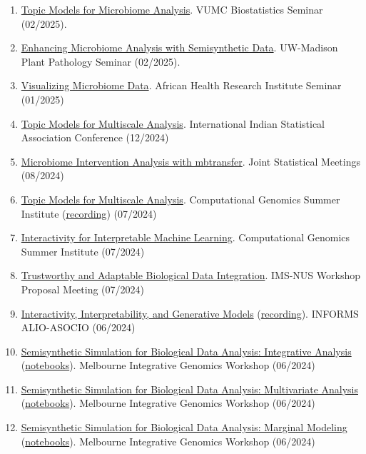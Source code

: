 \documentclass[letterpaper]{article}
\begin{document}
\begin{enumerate}
  \item \href{https://krisrs1128.github.io/talks/2025/20250226/20250226.html}{Topic Models for Microbiome Analysis}. VUMC Biostatistics Seminar (02/2025).
  \item \href{https://krisrs1128.github.io/talks/2025/20250218/20250218.html}{Enhancing Microbiome Analysis with Semisynthetic Data}. UW-Madison Plant Pathology Seminar (02/2025).
  \item \href{https://krisrs1128.github.io/talks/2025/20250115/20250115.html}{Visualizing Microbiome Data}. African Health Research Institute Seminar (01/2025)
  \item \href{https://go.wisc.edu/337726}{Topic Models for Multiscale Analysis}. International Indian Statistical Association Conference (12/2024)
  \item \href{https://go.wisc.edu/h5ow0o}{Microbiome Intervention Analysis with mbtransfer}. Joint Statistical Meetings (08/2024)
  \item \href{https://go.wisc.edu/6y38gg}{Topic Models for Multiscale Analysis}. Computational Genomics Summer Institute (\href{https://www.youtube.com/watch?v=NHacrfXcl98}{recording}) (07/2024)
  \item \href{https://go.wisc.edu/pl9a65}{Interactivity for Interpretable Machine Learning}. Computational Genomics Summer Institute (07/2024)
  \item \href{https://go.wisc.edu/8k8r2q}{Trustworthy and Adaptable Biological Data Integration}. IMS-NUS Workshop Proposal Meeting (07/2024)
  \item \href{https://go.wisc.edu/3u4m16}{Interactivity, Interpretability, and Generative Models} (\href{https://www.youtube.com/watch?v=UaYfwzkWq1Q&feature=youtu.be}{recording}). INFORMS ALIO-ASOCIO (06/2024)
  \item \href{https://go.wisc.edu/54tmr9}{Semisynthetic Simulation for Biological Data Analysis: Integrative Analysis} (\href{https://github.com/krisrs1128/intro-to-simulation/}{notebooks}). Melbourne Integrative Genomics Workshop (06/2024)
  \item \href{https://go.wisc.edu/rc776i}{Semisynthetic Simulation for Biological Data Analysis: Multivariate Analysis} (\href{https://github.com/krisrs1128/intro-to-simulation/}{notebooks}). Melbourne Integrative Genomics Workshop (06/2024)
  \item \href{https://go.wisc.edu/gfj36r}{Semisynthetic Simulation for Biological Data Analysis: Marginal Modeling} (\href{https://github.com/krisrs1128/intro-to-simulation/}{notebooks}). Melbourne Integrative Genomics Workshop (06/2024)

\end{enumerate}
\end{document}
